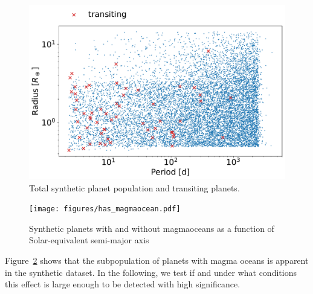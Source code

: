 \documentclass[modern]{aastex631}
\begin{document}
\begin{figure}
    \begin{centering}
        \includegraphics[width=\hsize]{figures/synthetic_population.pdf}
        \caption{Total synthetic planet population and transiting planets.}
        \label{fig:synthetic_population}
    \end{centering}
\end{figure}


\begin{figure}
    \begin{centering}
        \texttt{[image: figures/has\_magmaocean.pdf]}
        \caption{Synthetic planets with and without magmaoceans as a function of Solar-equivalent semi-major axis}
        \label{fig:has_magmaocean}
    \end{centering}
\end{figure}








\begin{note}
Figure~\ref{fig:has_magmaocean} shows that the subpopulation of planets with magma oceans is apparent in the synthetic dataset.
    In the following, we test if and under what conditions this effect is large enough to be detected with high significance.
\end{note}
\end{document}
